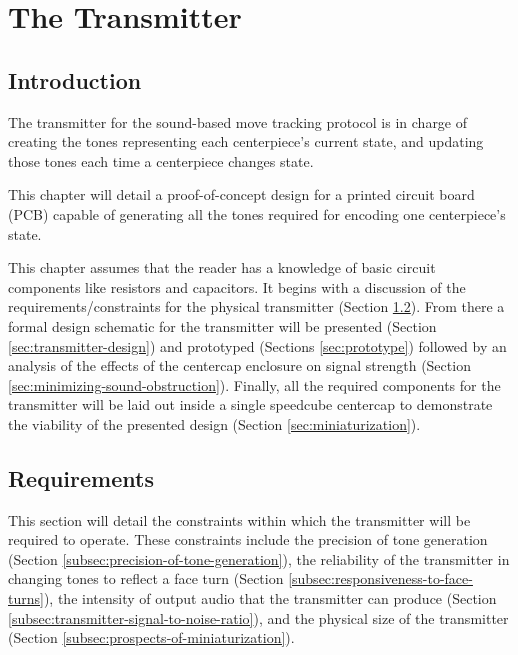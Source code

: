 %

\chapter{The Transmitter}
\label{Chapter6} 


\section{Introduction}

The transmitter for the sound-based move tracking protocol is in charge
of creating the tones representing each centerpiece's current state,
and updating those tones each time a centerpiece changes state.

This chapter will detail a proof-of-concept design for a printed
circuit board (PCB) capable of generating all the tones required for
encoding one centerpiece's state.

This chapter assumes that the reader has a knowledge of basic circuit
components like resistors and capacitors. It begins with a discussion
of the requirements/constraints for the physical transmitter (Section
\ref{sec:transmitter-requirements}). From there a formal design
schematic for the transmitter will be presented (Section
\ref{sec:transmitter-design}) and prototyped (Sections
\ref{sec:prototype}) followed by an analysis of the effects of the
centercap enclosure on signal strength (Section
\ref{sec:minimizing-sound-obstruction}). Finally, all the required
components for the transmitter will be laid out inside a single
speedcube centercap to demonstrate the viability of the presented
design (Section \ref{sec:miniaturization}).


\section{Requirements}
\label{sec:transmitter-requirements}

This section will detail the constraints within which the transmitter
will be required to operate. These constraints include the precision of
tone generation (Section \ref{subsec:precision-of-tone-generation}),
the reliability of the transmitter in changing tones to reflect a face
turn (Section \ref{subsec:responsiveness-to-face-turns}), the intensity
of output audio that the transmitter can produce (Section
\ref{subsec:transmitter-signal-to-noise-ratio}), and the physical size
of the transmitter (Section \ref{subsec:prospects-of-miniaturization}).

